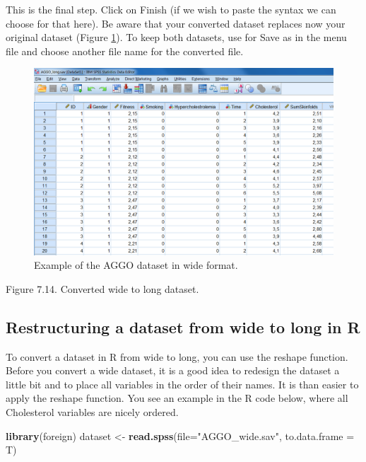 \documentclass[]{book}
\newenvironment{Shaded}{\begin{snugshade}}{\end{snugshade}}
\newcommand{\KeywordTok}[1]{\textcolor[rgb]{0.13,0.29,0.53}{\textbf{#1}}}
\newcommand{\DataTypeTok}[1]{\textcolor[rgb]{0.13,0.29,0.53}{#1}}
\newcommand{\StringTok}[1]{\textcolor[rgb]{0.31,0.60,0.02}{#1}}
\newcommand{\NormalTok}[1]{#1}
\theoremstyle{definition}
\theoremstyle{definition}
\theoremstyle{definition}
\theoremstyle{remark}
\begin{document}
This is the final step. Click on Finish (if we wish to paste the syntax
we can choose for that here). Be aware that your converted dataset
replaces now your original dataset (Figure \ref{fig:fig84}). To keep
both datasets, use for Save as in the menu file and choose another file
name for the converted file.

\begin{figure}

{\centering \includegraphics[width=0.9\linewidth]{images/fig7.14} 

}

\caption{Example of the AGGO dataset in wide format.}\label{fig:fig84}
\end{figure}

Figure 7.14. Converted wide to long dataset.

\subsection{Restructuring a dataset from wide to long in
R}\label{restructuring-a-dataset-from-wide-to-long-in-r}

To convert a dataset in R from wide to long, you can use the reshape
function. Before you convert a wide dataset, it is a good idea to
redesign the dataset a little bit and to place all variables in the
order of their names. It is than easier to apply the reshape function.
You see an example in the R code below, where all Cholesterol variables
are nicely ordered.

\begin{Shaded}
\begin{Highlighting}[]
\KeywordTok{library}\NormalTok{(foreign)}
\NormalTok{dataset <-}\StringTok{ }\KeywordTok{read.spss}\NormalTok{(}\DataTypeTok{file=}\StringTok{"AGGO_wide.sav"}\NormalTok{, }\DataTypeTok{to.data.frame =}\NormalTok{ T)}
\end{Highlighting}
\end{Shaded}
\end{document}
